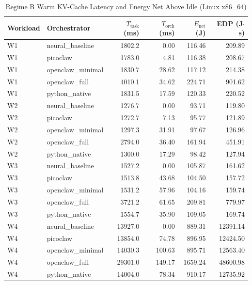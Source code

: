 \begin{table}[t]
\centering\small
\caption{Regime B Warm KV-Cache Latency and Energy Net Above Idle (Linux x86_64)}
\label{tab:linux_warm_cache}
\begin{tabular}{llrrrr}
\toprule
Workload & Orchestrator & $T_{\text{task}}$ (ms) & $T_{\text{orch}}$ (ms) & $E_{\text{net}}$ (J) & EDP (J$\cdot$s) \\
\midrule
W1 & neural\_baseline & 1802.2 & 0.00 & 116.46 & 209.89 \\
W1 & picoclaw & 1783.0 & 4.81 & 116.38 & 208.67 \\
W1 & openclaw\_minimal & 1830.7 & 28.62 & 117.12 & 214.38 \\
W1 & openclaw\_full & 4010.1 & 34.62 & 224.71 & 901.62 \\
W1 & python\_native & 1831.5 & 17.59 & 120.33 & 220.52 \\
W2 & neural\_baseline & 1276.7 & 0.00 & 93.71 & 119.80 \\
W2 & picoclaw & 1272.7 & 7.13 & 95.77 & 121.89 \\
W2 & openclaw\_minimal & 1297.3 & 31.91 & 97.67 & 126.96 \\
W2 & openclaw\_full & 2794.0 & 36.40 & 161.94 & 451.91 \\
W2 & python\_native & 1300.0 & 17.29 & 98.42 & 127.94 \\
W3 & neural\_baseline & 1527.2 & 0.00 & 105.87 & 161.62 \\
W3 & picoclaw & 1513.8 & 43.68 & 104.50 & 157.72 \\
W3 & openclaw\_minimal & 1531.2 & 57.96 & 104.16 & 159.74 \\
W3 & openclaw\_full & 3721.2 & 61.65 & 209.81 & 779.97 \\
W3 & python\_native & 1554.7 & 35.90 & 109.05 & 169.74 \\
W4 & neural\_baseline & 13927.0 & 0.00 & 889.31 & 12391.14 \\
W4 & picoclaw & 13854.0 & 74.78 & 896.95 & 12424.50 \\
W4 & openclaw\_minimal & 14030.3 & 100.63 & 895.71 & 12563.40 \\
W4 & openclaw\_full & 29301.0 & 149.17 & 1659.24 & 48600.98 \\
W4 & python\_native & 14004.0 & 78.34 & 910.17 & 12735.92 \\
\bottomrule
\end{tabular}
\end{table}
